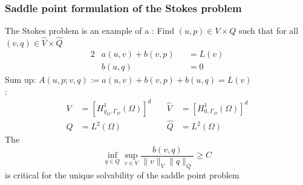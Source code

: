 \begin{frame}
  \frametitle{Saddle point formulation of the Stokes problem}
  The Stokes problem is an example of a :
  Find $(u,p) \in V \times Q$
  such that
  for all  $(v,q) \in \widehat{V} \times \widehat{Q}$
  \begin{alignat*}{2}
    &a(u,v) + b(v,p) & &= L(v)
    \\
    &b(u,q) \phantom{a(u,v)} & &= 0
  \end{alignat*}
  Sum up:
  $A(u,p;v,q) := a(u,v) + b(v,p) + b(u,q) = L(v)$
  \\
  :
  \begin{align*}
    V &=  [H^1_{g_D,\Gamma_D}(\Omega)]^d &\quad  \widehat{V} &=
    [H^1_{0,\Gamma_D}(\Omega)]^d \\
    Q &= L^2(\Omega) &\quad \widehat{Q} &= L^2(\Omega)
  \end{align*}
  The 
  \begin{equation*}
    \inf_{q \in Q} \sup_{v\in V} \dfrac{b(v,q)}{\| v \|_V \|q\|_Q }
    \geqslant C
  \end{equation*}
  is critical for the unique solvability of the saddle point problem
\end{frame}
